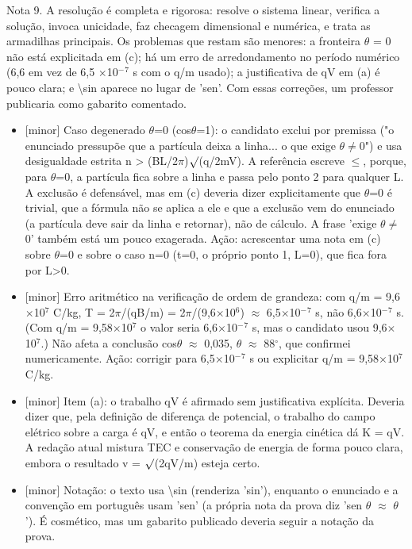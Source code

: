 \documentclass{article}%
\begin{document}
Nota 9. A resolução é completa e rigorosa: resolve o sistema linear, verifica a solução, invoca unicidade, faz checagem dimensional e numérica, e trata as armadilhas principais. Os problemas que restam são menores: a fronteira $\theta$ = 0 não está explicitada em (c); há um erro de arredondamento no período numérico (6,6 em vez de 6,5 $\times$10$^{-}$$^{7}$ s com o q/m usado); a justificativa de qV em (a) é pouco clara; e \textbackslash{}sin aparece no lugar de 'sen'. Com essas correções, um professor publicaria como gabarito comentado.%
\begin{itemize}%
\item%
{[}minor{]} Caso degenerado $\theta$=0 (cos$\theta$=1): o candidato exclui por premissa ("o enunciado pressupõe que a partícula deixa a linha... o que exige $\theta$$\neq$0") e usa desigualdade estrita n > (BL/2$\pi$)$\surd$(q/2mV). A referência escreve $\leq$, porque, para $\theta$=0, a partícula fica sobre a linha e passa pelo ponto 2 para qualquer L. A exclusão é defensável, mas em (c) deveria dizer explicitamente que $\theta$=0 é trivial, que a fórmula não se aplica a ele e que a exclusão vem do enunciado (a partícula deve sair da linha e retornar), não de cálculo. A frase 'exige $\theta$$\neq$0' também está um pouco exagerada. Ação: acrescentar uma nota em (c) sobre $\theta$=0 e sobre o caso n=0 (t=0, o próprio ponto 1, L=0), que fica fora por L>0.%
\item%
{[}minor{]} Erro aritmético na verificação de ordem de grandeza: com q/m = 9,6$\times$10$^{7}$ C/kg, T = 2$\pi$/(qB/m) = 2$\pi$/(9,6$\times$10$^{6}$) $\approx$ 6,5$\times$10$^{-}$$^{7}$ s, não 6,6$\times$10$^{-}$$^{7}$ s. (Com q/m = 9,58$\times$10$^{7}$ o valor seria 6,6$\times$10$^{-}$$^{7}$ s, mas o candidato usou 9,6$\times$10$^{7}$.) Não afeta a conclusão cos$\theta$ $\approx$ 0,035, $\theta$ $\approx$ 88$^\circ$, que confirmei numericamente. Ação: corrigir para 6,5$\times$10$^{-}$$^{7}$ s ou explicitar q/m = 9,58$\times$10$^{7}$ C/kg.%
\item%
{[}minor{]} Item (a): o trabalho qV é afirmado sem justificativa explícita. Deveria dizer que, pela definição de diferença de potencial, o trabalho do campo elétrico sobre a carga é qV, e então o teorema da energia cinética dá K = qV. A redação atual mistura TEC e conservação de energia de forma pouco clara, embora o resultado v = $\surd$(2qV/m) esteja certo.%
\item%
{[}minor{]} Notação: o texto usa \textbackslash{}sin (renderiza 'sin'), enquanto o enunciado e a convenção em português usam 'sen' (a própria nota da prova diz 'sen $\theta$ $\approx$ $\theta$'). É cosmético, mas um gabarito publicado deveria seguir a notação da prova.%
\end{itemize}%
\end{document}
